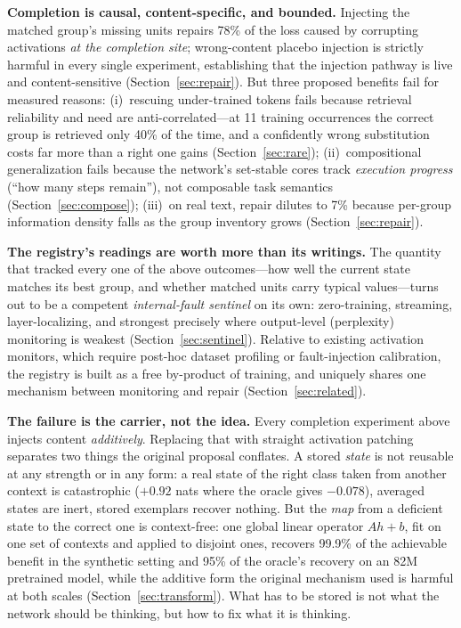 \documentclass[11pt]{article}
\begin{document}
\textbf{Completion is causal, content-specific, and bounded.} Injecting the
matched group's missing units repairs 78\% of the loss caused by corrupting
activations \emph{at the completion site}; wrong-content placebo injection is
strictly harmful in every single experiment, establishing that the injection
pathway is live and content-sensitive (Section~\ref{sec:repair}). But three
proposed benefits fail for measured reasons: (i)~rescuing under-trained tokens
fails because retrieval reliability and need are anti-correlated---at 11
training occurrences the correct group is retrieved only 40\% of the time, and
a confidently wrong substitution costs far more than a right one gains
(Section~\ref{sec:rare}); (ii)~compositional generalization fails because the
network's set-stable cores track \emph{execution progress} (``how many steps
remain''), not composable task semantics (Section~\ref{sec:compose});
(iii)~on real text, repair dilutes to 7\% because per-group information density
falls as the group inventory grows (Section~\ref{sec:repair}).

\textbf{The registry's readings are worth more than its writings.} The
quantity that tracked every one of the above outcomes---how well the current
state matches its best group, and whether matched units carry typical
values---turns out to be a competent \emph{internal-fault sentinel} on its own:
zero-training, streaming, layer-localizing, and strongest precisely where
output-level (perplexity) monitoring is weakest (Section~\ref{sec:sentinel}).
Relative to existing activation monitors, which require post-hoc dataset
profiling or fault-injection calibration, the registry is built as a free
by-product of training, and uniquely shares one mechanism between monitoring
and repair (Section~\ref{sec:related}).

\textbf{The failure is the carrier, not the idea.} Every completion experiment
above injects content \emph{additively}. Replacing that with straight activation
patching separates two things the original proposal conflates. A stored
\emph{state} is not reusable at any strength or in any form: a real state of the
right class taken from another context is catastrophic ($+0.92$ nats where the
oracle gives $-0.078$), averaged states are inert, stored exemplars recover
nothing. But the \emph{map} from a deficient state to the correct one is
context-free: one global linear operator $A h + b$, fit on one set of contexts
and applied to disjoint ones, recovers 99.9\% of the achievable benefit in the
synthetic setting and 95\% of the oracle's recovery on an 82M pretrained model,
while the additive form the original mechanism used is harmful at both scales
(Section~\ref{sec:transform}). What has to be stored is not what the network
should be thinking, but how to fix what it is thinking.
\end{document}
